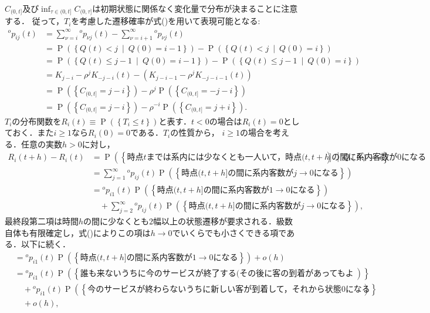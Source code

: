 \documentclass[a4j,papersize,disablejfam,slide,14pt]{jsarticle}
\def\inf#1#2{\operatorname*{inf}_{#1} #2 } %
\def\prob#1{\operatorname{P} \left(\left\{ #1 \right\}\right)} %
\def\cprob#1#2{\operatorname{P} \left(\left\{ #1 \ \middle|\ #2 \right\}\right)} %
\begin{document}
    $C_{(0,t]}$及び$\inf{ \tau \in (0, t] }{ C_{(0, \tau]} }$は初期状態に関係なく変化量で分布が決まることに注意する．
    従って，$T_i$を考慮した遷移確率が式()を用いて表現可能となる:
    \begin{align}
    	{}^{o}p_{ij}(t) &= \sum_{\nu=i}^{\infty} {}^{o}p_{\nu j}(t) - \sum_{\nu=i+1}^{\infty} {}^{o}p_{\nu j}(t) \\
        &= \cprob{Q(t) < j}{Q(0) = i-1} - \cprob{Q(t) < j}{Q(0) = i} \\
        &= \cprob{Q(t) \leq j-1}{Q(0) = i-1} - \cprob{Q(t) \leq j-1}{Q(0) = i} \\
        &= K_{j-i} - \rho^{j} K_{-j-i}(t) - (K_{j-i-1} - \rho^{j} K_{-j-i-1}(t)) \\
        &= \prob{C_{(0, t]} = j-i} - \rho^{j} \prob{C_{(0, t]} = -j-i} \\
        &= \prob{C_{(0, t]} = j-i} - \rho^{-i} \prob{C_{(0, t]} = j+i}.
    \end{align}
    $T_i$の分布関数を$R_i(t) \equiv \prob{T_i \leq t}$と表す．$t<0$の場合は$R_i(t) = 0$としておく．また$i \geq 1$なら$R_i(0)=0$である．$T_i$の性質から，
    $i \geq 1$の場合を考える．任意の実数$h>0$に対し，
    \begin{align}
    	R_i(t + h) - R_i(t) &= \cprob{\mbox{時点$t$までは系内には少なくとも一人いて，時点$(t, t+h]$の間に系内客数が$0$になる}}{Q(0)=i} \\
        &= \sum_{j=1}^{\infty} {}^{o}p_{ij}(t) \prob{\mbox{時点$(t, t+h]$の間に系内客数が$j \to 0$になる}} \\
        &= {}^{o}p_{i1}(t) \prob{\mbox{時点$(t, t+h]$の間に系内客数が$1 \to 0$になる}} \\
        &\quad+ \sum_{j=2}^{\infty} {}^{o}p_{ij}(t) \prob{\mbox{時点$(t, t+h]$の間に系内客数が$j \to 0$になる}},
    \end{align}
    最終段第二項は時間$h$の間に少なくとも$2$幅以上の状態遷移が要求される．級数自体も有限確定し，式()によりこの項は$h \to 0$でいくらでも小さくできる項である．以下に続く．
    \begin{align}
    	&= {}^{o}p_{i1}(t) \prob{\mbox{時点$(t, t+h]$の間に系内客数が$1 \to 0$になる}} + o(h) \\
        &= {}^{o}p_{i1}(t) \prob{\mbox{誰も来ないうちに今のサービスが終了する(その後に客の到着があってもよい)}} \\
        &\quad + {}^{o}p_{i1}(t) \prob{\mbox{今のサービスが終わらないうちに新しい客が到着して，それから状態$0$になる}} \\
        &\quad + o(h),
    \end{align}
\end{document}
